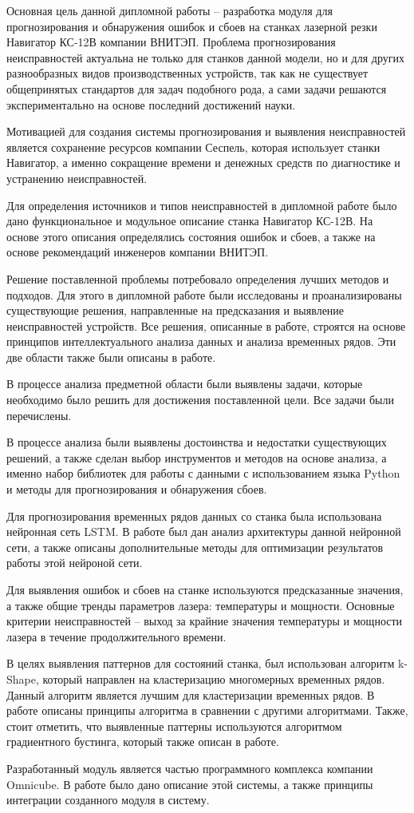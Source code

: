 
Основная цель данной дипломной работы --
разработка модуля для прогнозирования
и обнаружения ошибок и сбоев на станках лазерной резки Навигатор КС-12В компании ВНИТЭП.
Проблема прогнозирования неисправностей актуальна не только для станков данной модели,
но и для других разнообразных видов производственных устройств,
так как не существует общепринятых стандартов для задач подобного рода,
а сами задачи решаются экспериментально на основе последний достижений науки.

Мотивацией для создания системы прогнозирования и выявления неисправностей
является сохранение ресурсов компании Сеспель, которая использует станки Навигатор,
а именно сокращение времени и денежных средств по диагностике и устранению неисправностей.

Для определения источников и типов неисправностей
в дипломной работе было дано функциональное и модульное описание станка Навигатор КС-12В.
На основе этого описания определялись состояния ошибок и сбоев,
а также на основе рекомендаций инженеров компании ВНИТЭП.

Решение поставленной проблемы потребовало определения лучших методов и подходов.
Для этого в дипломной работе были исследованы и проанализированы существующие
решения, направленные на предсказания и выявление неисправностей
устройств.
Все решения, описанные в работе, строятся на основе принципов
интеллектуального анализа данных и анализа временных рядов.
Эти две области также были описаны в работе.

В процессе анализа предметной области
были выявлены задачи, которые необходимо было решить для достижения поставленной цели.
Все задачи были перечислены.

В процессе анализа были выявлены достоинства и недостатки существующих решений,
а также сделан выбор инструментов и методов на основе анализа,
а именно набор библиотек для работы с данными с использованием языка Python
и методы для прогнозирования и обнаружения сбоев.

Для прогнозирования временных рядов данных со станка
была использована нейронная сеть LSTM.
В работе был дан анализ архитектуры данной нейронной сети,
а также описаны дополнительные методы
для оптимизации результатов работы этой нейроной сети.

Для выявления ошибок и сбоев на станке
используются предсказанные значения,
а также общие тренды параметров лазера: температуры и мощности.
Основные критерии неисправностей -- выход за крайние значения
температуры и мощности лазера в течение продолжительного времени.

В целях выявления паттернов для состояний станка,
был использован алгоритм k-Shape,
который направлен на кластеризацию многомерных временных рядов.
Данный алгоритм является лучшим для кластеризации временных рядов.
В работе описаны принципы алгоритма в сравнении с другими алгоритмами.
Также, стоит отметить, что выявленные паттерны используются алгоритмом градиентного бустинга,
который также описан в работе.

Разработанный модуль является частью программного комплекса компании Omnicube.
В работе было дано описание этой системы,
а также принципы интеграции созданного модуля в систему.

\clearpage